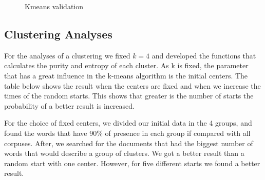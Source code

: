 \documentclass[a4paper,11pt]{article}
\begin{document}
\begin{figure}[ht!]
\begin{centering}
{    }
  \end{centering}
  \caption{Kmeans validation}
  \label{fig:val}
\end{figure}

\subsection{Clustering Analyses}

For the  analyses of a clustering  we fixed $k  = 4$ and developed  the functions
that calculates the purity and entropy of each cluster. As k is fixed, the 
parameter that  has a great influence  in the k-means algorithm  is the initial
centers. The table below shows the result when the centers are fixed and when we
increase the times  of the random starts. This shows that  greater is the number
of starts the probability of a better result is increased. 

For the choice of fixed centers, we divided
our initial data in the 4 groups, and found the words that have 90\% of presence in each group
if compared with all corpuses.  After, we searched for the documents that had the
biggest number of words that would describe a group of clusters. 
We got a  better result than a  random start with one center.  However, for five
different starts we found a better result. 
\end{document}
